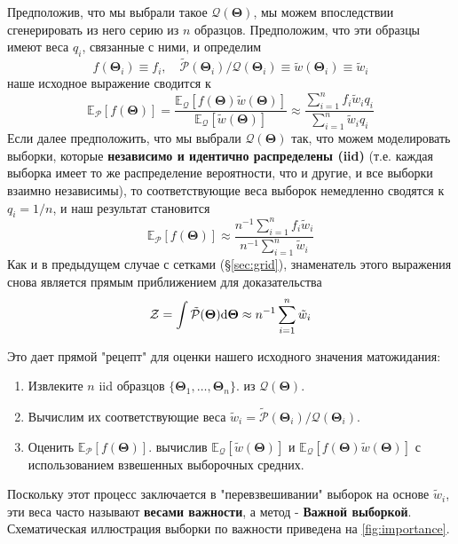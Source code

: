 \documentclass[12pt, titlepage]{article}
\newcommand{\deriv}{\ensuremath{{\rm d}}}  %
\newcommand{\meanwrt}[2]{\ensuremath{\mathbb{E}_{{#2}}\left[{#1}\right]}}
\newcommand{\params}{\ensuremath{\boldsymbol\Theta}}
\newcommand{\posterior}{\ensuremath{\mathcal{P}}}
\newcommand{\proposal}{\ensuremath{\mathcal{Q}}}
\newcommand{\evidence}{\ensuremath{\mathcal{Z}}}
\begin{document}
Предположив, что мы выбрали такое $\proposal(\params)$, мы можем впоследствии сгенерировать из него серию из $n$ образцов. Предположим, что эти образцы имеют веса $q_i$, связанные с ними, и определим
\begin{equation}
    f(\params_i) \equiv f_i, \quad
    \tilde{\posterior}(\params_i)/\proposal(\params_i) 
    \equiv \tilde{w}(\params_i) \equiv \tilde{w}_i
\end{equation}
наше исходное выражение сводится к
\begin{equation}
    \meanwrt{f(\params)}{\posterior} 
    = \frac{\meanwrt{f(\params) 
    \tilde{w}(\params)}{\proposal}}
    {\meanwrt{\tilde{w}(\params)}{\proposal}}
    \approx \frac{\sum_{i=1}^{n} f_i \tilde{w}_i q_i}
    {\sum_{i=1}^{n} \tilde{w}_i q_i}
\end{equation}
Если далее предположить, что мы выбрали $\proposal(\params)$ так, что можем моделировать выборки, которые \textbf{независимо и идентично распределены (iid)} (т.е. каждая выборка имеет то же распределение вероятности, что и другие, и все выборки взаимно независимы), то соответствующие веса выборок немедленно сводятся к $q_i = 1/n$, и наш результат становится
\begin{equation}
    \meanwrt{f(\params)}{\posterior} 
    \approx \frac{n^{-1} \sum_{i=1}^{n} f_i \tilde{w}_i}
    {n^{-1} \sum_{i=1}^{n} \tilde{w}_i}
\end{equation}
Как и в предыдущем случае с сетками (\S\ref{sec:grid}), знаменатель этого выражения снова является прямым приближением для доказательства
\begin{align}
    \evidence 
    = \int \tilde{\posterior}(\params) \deriv \params
    \approx n^{-1} \sum_{i=1}^{n} \tilde{w}_i
\end{align}

Это дает прямой "рецепт" для оценки нашего исходного значения матожидания:
\begin{enumerate}
	\item Извлеките $n$ iid образцов $\{\params_1, \dots, \params_n \}$.
	из $\proposal(\params)$.
	\item Вычислим их соответствующие веса $\tilde{w}_i =
	\tilde{\posterior}(\params_i)/\proposal(\params_i)$.
	\item Оценить $\meanwrt{f(\params)}{\posterior}$. вычислив $\meanwrt{\tilde{w}(\params)}{\proposal}$ и
	$\meanwrt{f(\params)\tilde{w}(\params)}{\proposal}$ с использованием взвешенных выборочных средних.
\end{enumerate}
Поскольку этот процесс заключается в "перевзвешивании" выборок на основе $\tilde{w}_i$, эти веса часто называют \textbf{весами важности}, а метод - \textbf{Важной выборкой}. Схематическая иллюстрация выборки по важности приведена на {\color{red} \autoref{fig:importance}}.
\end{document}
